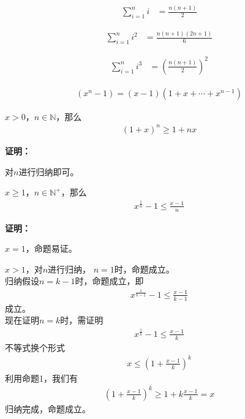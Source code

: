 \documentclass{article}
\begin{document}
\begin{align*}
    \sum\limits_{i = 1}^n i & = \frac{n(n+1)}{2}
\end{align*}

\begin{align*}
    \sum\limits_{i = 1}^n i^2 & = \frac{n(n+1)(2n+1)}{6}
\end{align*}

\begin{align*}
    \sum\limits_{i = 1}^n i^3 & = \left(\frac{n(n+1)}{2}\right)^2
\end{align*}

\begin{align*}
    (x^n - 1) = (x - 1)(1 + x + \cdots + x^{n-1})
\end{align*}

\begin{zremark}
    $x > 0$，$n \in \mathbb{N}$，那么
    \begin{align*}
        (1 + x)^n \geq 1 + nx
    \end{align*}
\end{zremark}

\textbf{证明：}

对$n$进行归纳即可。

\begin{zremark}
    $x \geq 1$，$n \in \mathbb{N}^+$，那么
    \begin{align*}
        x^{\frac{1}{n}} - 1 \leq \frac{x - 1}{n}
    \end{align*}
\end{zremark}

\textbf{证明：}

$x = 1$，命题易证。

$x > 1$，对$n$进行归纳，
$n = 1$时，命题成立。\\
归纳假设$n = k - 1$时，命题成立，即
\begin{align*}
    x^{\frac{1}{k - 1}} - 1 \leq \frac{x - 1}{k - 1}
\end{align*}
成立。\\
现在证明$n = k$时，需证明
\begin{align*}
    x^{\frac{1}{k}} - 1 \leq \frac{x - 1}{k}
\end{align*}
不等式换个形式
\begin{align*}
    x \leq (1 + \frac{x - 1}{k})^k
\end{align*}
利用命题1，我们有
\begin{align*}
    (1 + \frac{x - 1}{k})^k \geq 1 + k \frac{x - 1}{k} = x
\end{align*}
归纳完成，命题成立。
\end{document}
